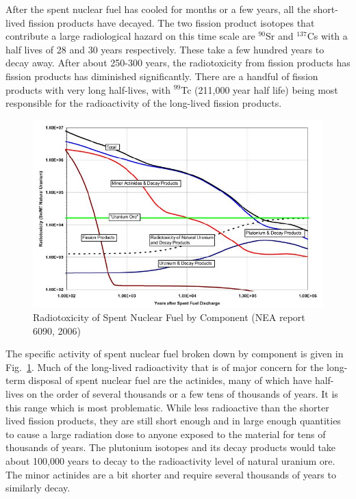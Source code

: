 After the spent nuclear fuel has cooled for months or a few years, all the short-lived fission products have decayed. The two fission product isotopes that contribute a large radiological hazard on this time scale are $^{90}$Sr and $^{137}$Cs with a half lives of 28 and 30 years respectively. These take a few hundred years to decay away. After about 250-300 years, the radiotoxicity from fission products has fission products has diminished significantly. There are a handful of fission products with very long half-lives, with $^{99}$Tc (211,000 year half life) being most responsible for the radioactivity of the long-lived fission products.

\begin{figure}[tb!]
\begin{center}
\includegraphics[width=1.0\textwidth]{./Figures/NEASpentNuclearlFuel.jpeg}
\caption{Radiotoxicity of Spent Nuclear Fuel by Component (NEA report 6090, 2006)}
\label{Fig:kinetics_spentNuclearFuelRadiotoxicity}
\end{center}
\end{figure}

The specific activity of spent nuclear fuel broken down by component is given in Fig.~\ref{Fig:kinetics_spentNuclearFuelRadiotoxicity}. Much of the long-lived radioactivity that is of major concern for the long-term disposal of spent nuclear fuel are the actinides, many of which have half-lives on the order of several thousands or a few tens of thousands of years. It is this range which is most problematic. While less radioactive than the shorter lived fission products, they are still short enough and in large enough quantities to cause a large radiation dose to anyone exposed to the material for tens of thousands of years. The plutonium isotopes and its decay products would take about 100,000 years to decay to the radioactivity level of natural uranium ore. The minor actinides are a bit shorter and require several thousands of years to similarly decay.

